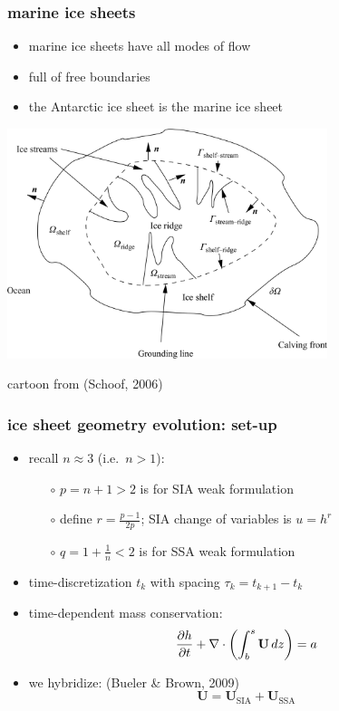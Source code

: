 \documentclass{beamer}
\newcommand{\Div}{\nabla\cdot}
\begin{document}
\begin{frame}
  \frametitle{marine ice sheets}

\begin{itemize}
\item marine ice sheets have all modes of flow
\item full of free boundaries
\item the Antarctic ice sheet is the marine ice sheet
\end{itemize}

\begin{center}
\includegraphics[width=0.7\textwidth]{schoof-planform}

\tiny cartoon from (Schoof, 2006)
\end{center}
\end{frame}


\begin{frame}
  \frametitle{ice sheet geometry evolution: set-up}

\begin{itemize}
\item recall $n\approx 3$ (i.e.~$n>1$):
  \begin{itemize}
  \item[$\circ$] $p = n+1 > 2$ \quad  is for SIA weak formulation
  \item[$\circ$] define $r = \frac{p-1}{2p}$; \quad SIA change of variables is $u=h^r$
  \item[$\circ$] $q = 1 + \frac{1}{n} < 2$ \quad  is for SSA weak formulation
  \end{itemize}
\item time-discretization $t_k$ with spacing $\tau_k = t_{k+1}-t_k$

\bigskip
\item time-dependent mass conservation: 
  $$\frac{\partial h}{\partial t} + \Div \left(  \int_b^s {\bf U}\, dz \right)  =  a$$
\item we hybridize: \hfill \scriptsize (Bueler \& Brown, 2009) \normalsize
  $$\mathbf{U} = \mathbf{U}_{\text{SIA}} + \mathbf{U}_{\text{SSA}}$$
\end{itemize}
\end{frame}
\end{document}
